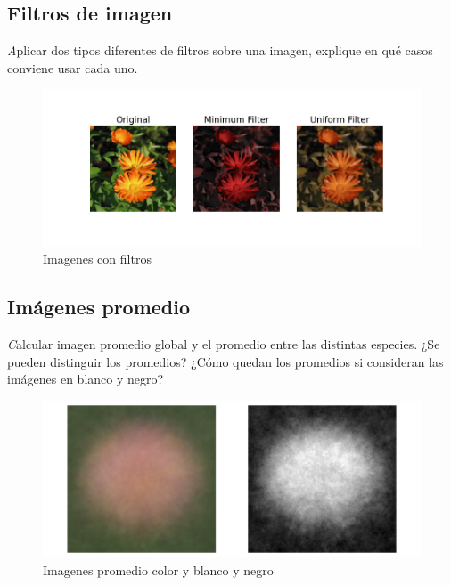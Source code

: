 \documentclass{article}
\begin{document}
\subsection{Filtros de imagen}

{\emph Aplicar dos tipos diferentes de filtros sobre una imagen, 
explique en qué casos conviene usar cada uno.}
\pagebreak

\begin{figure}[h!]
  \centering    
  \includegraphics[width=1\textwidth]{6_filtro.png}
  \caption{Imagenes con filtros}
\end{figure}

\subsection{Imágenes promedio}

{\emph Calcular imagen promedio global y el promedio entre las distintas especies. ¿Se pueden
distinguir los promedios? ¿Cómo quedan los promedios si consideran las imágenes en
blanco y negro?}

\begin{figure}[h!]
  \centering    
  \includegraphics[width=.7\textwidth]{7_1_promedio.png}
  \caption{Imagenes promedio color y blanco y negro}
\end{figure}
\end{document}
